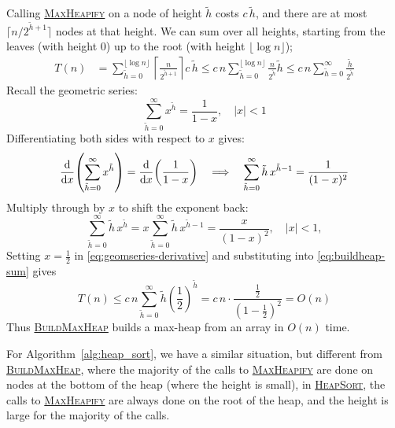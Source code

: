 Calling \textsc{\hyperref[alg:heapify]{MaxHeapify}} on a node of height $\tilde{h}$ costs $c \, \tilde{h}$, and there are at most $\lceil n/2^{\tilde{h}+1}\rceil$ nodes at that height.  
We can sum over all heights, starting from the leaves (with height $0$) up to the root (with height $\lfloor\log n\rfloor$);
\begin{align}
T(n)
&=\sum_{\tilde{h}=0}^{\lfloor\log n\rfloor}\left\lceil \frac{n}{2^{\tilde{h}+1}}\right\rceil c \, \tilde{h}
\leq c \, n \sum_{\tilde{h}=0}^{\lfloor\log n\rfloor}\frac{n}{2^{\tilde{h}}} \tilde{h}
\leq c \, n \sum_{\tilde{h}=0}^{\infty}\frac{\tilde{h}}{2^{\tilde{h}}}
\label{eq:buildheap-sum}
\end{align}
Recall the geometric series:
\[
  \sum_{\tilde{h}=0}^\infty x^{\tilde{h}} = \frac1{1-x}, \quad |x|<1
\]
Differentiating both sides with respect to \(x\) gives:
\[
  \frac{\mathrm{d}}{\mathrm{d} x}\!\left(\sum_{\tilde{h}=0}^\infty x^{\tilde{h}}\right)
  = \frac{\mathrm{d}}{\mathrm{d} x}\!\left(\frac1{1-x}\right)
  \quad\Longrightarrow\quad
  \sum_{\tilde{h}=0}^\infty \tilde{h}\,x^{\tilde{h}-1} = \frac1{(1-x)^2}
\]
Multiply through by \(x\) to shift the exponent back:
\begin{equation}
\label{eq:geomseries-derivative}
\sum_{\tilde{h}=0}^\infty \tilde{h}\,x^{\tilde{h}}
= x \sum_{\tilde{h}=0}^\infty \tilde{h}\,x^{\tilde{h}-1}
= \frac{x}{(1-x)^2},\quad |x|<1,
\end{equation}
Setting $x=\tfrac12$ in \eqref{eq:geomseries-derivative} and substituting into \eqref{eq:buildheap-sum} gives
\begin{equation}
T(n) \leq c \, n \sum_{\tilde{h}=0}^{\infty}\tilde{h}\left(\frac{1}{2}\right)^{\tilde{h}} = c \, n \cdot \frac{\frac{1}{2}}{\left(1-\frac{1}{2}\right)^2} = O(n)
\end{equation}
Thus \textsc{\hyperref[alg:build_heap]{BuildMaxHeap}} builds a max-heap from an array in $O(n)$ time.


For Algorithm~\ref{alg:heap_sort}, we have a similar situation, but different from \textsc{\hyperref[alg:build_heap]{BuildMaxHeap}}, where the majority of the calls to \textsc{\hyperref[alg:heapify]{MaxHeapify}} are done on nodes at the bottom of the heap (where the height is small), in \textsc{\hyperref[alg:heap_sort]{HeapSort}}, the calls to \textsc{\hyperref[alg:heapify]{MaxHeapify}} are always done on the root of the heap, and the height is large for the majority of the calls.

